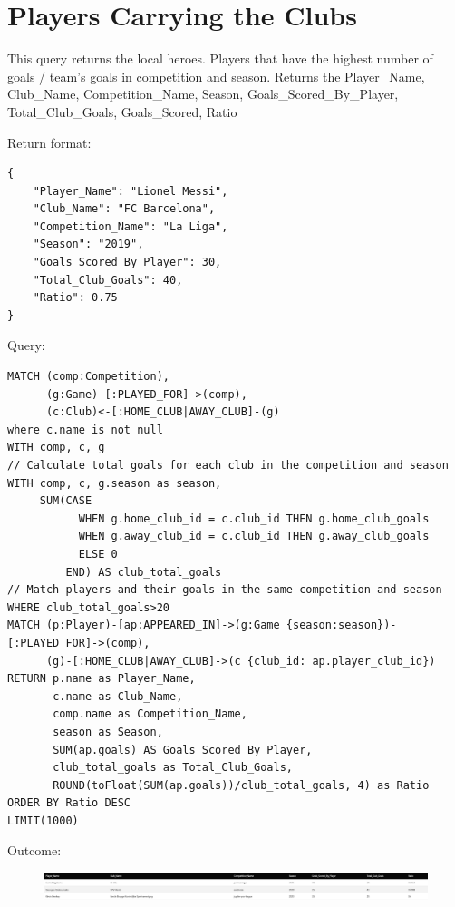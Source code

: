 \documentclass{Configuration_Files/PoliMi3i_thesis}
\begin{document}
\section{Players Carrying the Clubs}
This query returns the local heroes. Players that have the highest number of goals / team's goals in competition and season.
Returns the Player\_Name, Club\_Name, Competition\_Name, Season, Goals\_Scored\_By\_Player, Total\_Club\_Goals, Goals\_Scored, Ratio

Return format:
\begin{lstlisting}[style=json]
{
    "Player_Name": "Lionel Messi",
    "Club_Name": "FC Barcelona",
    "Competition_Name": "La Liga",
    "Season": "2019",
    "Goals_Scored_By_Player": 30,
    "Total_Club_Goals": 40,
    "Ratio": 0.75
}
\end{lstlisting}


Query:

\begin{lstlisting}[language=Cypher]
MATCH (comp:Competition), 
      (g:Game)-[:PLAYED_FOR]->(comp),
      (c:Club)<-[:HOME_CLUB|AWAY_CLUB]-(g)
where c.name is not null
WITH comp, c, g
// Calculate total goals for each club in the competition and season
WITH comp, c, g.season as season,
     SUM(CASE 
           WHEN g.home_club_id = c.club_id THEN g.home_club_goals 
           WHEN g.away_club_id = c.club_id THEN g.away_club_goals 
           ELSE 0 
         END) AS club_total_goals
// Match players and their goals in the same competition and season
WHERE club_total_goals>20
MATCH (p:Player)-[ap:APPEARED_IN]->(g:Game {season:season})-[:PLAYED_FOR]->(comp), 
      (g)-[:HOME_CLUB|AWAY_CLUB]->(c {club_id: ap.player_club_id})
RETURN p.name as Player_Name, 
       c.name as Club_Name, 
       comp.name as Competition_Name, 
       season as Season, 
       SUM(ap.goals) AS Goals_Scored_By_Player, 
       club_total_goals as Total_Club_Goals,
       ROUND(toFloat(SUM(ap.goals))/club_total_goals, 4) as Ratio
ORDER BY Ratio DESC
LIMIT(1000)
\end{lstlisting}


Outcome:
\begin{figure}[H]
    \centering
    \includegraphics[width=\linewidth]{Project Template/Images/query_output/q10.png}
\end{figure}
\end{document}

